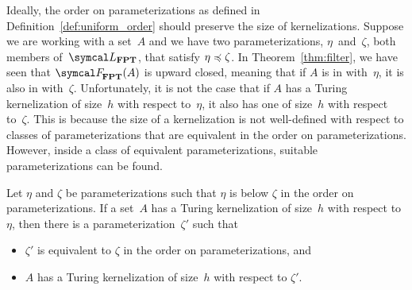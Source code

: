 Ideally, the order on parameterizations as defined in Definition~\ref{def:uniform_order} should preserve the size of kernelizations.
Suppose we are working with a set~$A$ and we have two parameterizations, $\eta$~and~$\zeta$, both members of~$\calL_\cl{FPT}$, that satisfy $\eta \preccurlyeq \zeta$.
In Theorem~\ref{thm:filter}, we have seen that $\calF_\cl{FPT}(A)$ is upward closed, meaning that if $A$ is in  with~$\eta$, it is also in  with~$\zeta$.
Unfortunately, it is not the case that if $A$ has a Turing kernelization of size~$h$ with respect to~$\eta$, it also has one of size~$h$ with respect to~$\zeta$.
This is because the size of a kernelization is not well-defined with respect to classes of parameterizations that are equivalent in the order on parameterizations.
However, inside a class of equivalent parameterizations, suitable parameterizations can be found.
\begin{theorem}
  Let $\eta$ and $\zeta$ be parameterizations such that $\eta$ is below $\zeta$ in the order on parameterizations.
  If a set~$A$ has a Turing kernelization of size~$h$ with respect to $\eta$, then there is a parameterization~$\zeta'$ such that
  \begin{itemize}
  \item $\zeta'$ is equivalent to $\zeta$ in the order on parameterizations, and
  \item $A$ has a Turing kernelization of size~$h$ with respect to $\zeta'$.
  \end{itemize}
\end{theorem}
